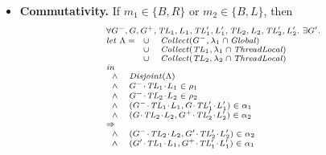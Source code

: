 \begin{itemize}
\item {\bf Commutativity.}
If $m_1 \in \{B,R\}$ or $m_2 \in \{B,L\}$, then 
\[
\scriptsize{
\begin{array}{l}
\forall \varsG^-,\varsG,\varsG^+,\varsTL_1,\varsL_1,\varsTL'_1,\varsL'_1,\varsTL_2,\varsL_2,\varsTL'_2,\varsL'_2.\ \exists \varsG'. \\
\mathit{let}\ \Lambda =
\begin{array}[t]{ll}
\cup & \Collect(\varsG^-, \lins_1 \cap \Global) \\
\cup & \Collect(\varsTL_1, \lins_1 \cap \ThreadLocal) \\
\cup & \Collect(\varsTL_2, \lins_2 \cap \ThreadLocal) 
\end{array} \\
\mathit{in}\\
\begin{array}{ll}
\wedge & \Disjoint(\Lambda) \\
\wedge & \MakeStore{\varsG^-}{\varsTL_1}{\varsL_1} \in \rho_1 \\
\wedge & \MakeStore{\varsG^-}{\varsTL_2}{\varsL_2} \in \rho_2 \\
\wedge & (\MakeStore{\varsG^-}{\varsTL_1}{\varsL_1},\MakeStore{\varsG}{\varsTL'_1}{\varsL'_1}) \in \alpha_1 \\
\wedge & (\MakeStore{\varsG}{\varsTL_2}{\varsL_2},\MakeStore{\varsG^+}{\varsTL'_2}{\varsL'_2}) \in \alpha_2 \\
\end{array} \\
\Rightarrow \\
\begin{array}{ll}
\wedge & (\MakeStore{\varsG^-}{\varsTL_2}{\varsL_2},\MakeStore{\varsG'}{\varsTL'_2}{\varsL'_2}) \in \alpha_2 \\
\wedge & (\MakeStore{\varsG'}{\varsTL_1}{\varsL_1},\MakeStore{\varsG^+}{\varsTL'_1}{\varsL'_1}) \in \alpha_1 \\
\end{array}
\end{array}
}
\]


\end{itemize}
